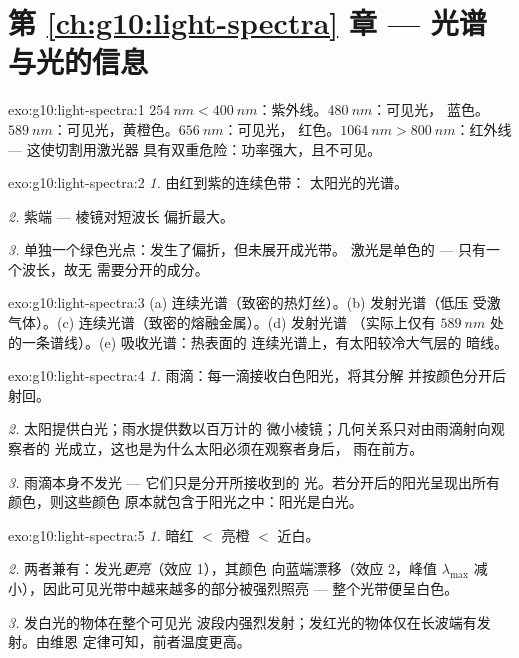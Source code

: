\section*{第 \ref{ch:g10:light-spectra} 章 --- 光谱与光的信息}

\begin{solution}{exo:g10:light-spectra:1}
$\qty{254}{nm} < \qty{400}{nm}$：紫外线。$\qty{480}{nm}$：可见光，
蓝色。$\qty{589}{nm}$：可见光，黄橙色。$\qty{656}{nm}$：可见光，
红色。$\qty{1064}{nm} > \qty{800}{nm}$：红外线 --- 这使切割用激光器
具有双重危险：功率强大，且不可见。
\end{solution}

\begin{solution}{exo:g10:light-spectra:2}
\emph{1.} 由红到紫的连续色带：
太阳光的光谱。

\emph{2.} 紫端 --- 棱镜对短波长
偏折最大。

\emph{3.} 单独一个绿色光点：发生了偏折，但未展开成光带。
激光是单色的 --- 只有一个波长，故无
需要分开的成分。
\end{solution}

\begin{solution}{exo:g10:light-spectra:3}
(a) 连续光谱（致密的热灯丝）。(b) 发射光谱（低压
受激气体）。(c) 连续光谱（致密的熔融金属）。(d) 发射光谱
（实际上仅有 $\qty{589}{nm}$ 处的一条谱线）。(e) 吸收光谱：热表面的
连续光谱上，有太阳较冷大气层的
暗线。
\end{solution}

\begin{solution}{exo:g10:light-spectra:4}
\emph{1.} 雨滴：每一滴接收白色阳光，将其分解
并按颜色分开后射回。

\emph{2.} 太阳提供白光；雨水提供数以百万计的
微小棱镜；几何关系只对由雨滴射向观察者的
光成立，这也是为什么太阳必须在观察者身后，
雨在前方。

\emph{3.} 雨滴本身不发光 --- 它们只是分开所接收到的
光。若分开后的阳光呈现出所有颜色，则这些颜色
原本就包含于阳光之中：阳光是白光。
\end{solution}

\begin{solution}{exo:g10:light-spectra:5}
\emph{1.} 暗红 $<$ 亮橙 $<$ 近白。

\emph{2.} 两者兼有：发光\emph{更亮}（效应 1），其颜色
向蓝端漂移（效应 2，峰值 $\lambda_{\max}$
减小），因此可见光带中越来越多的部分被强烈照亮 ---
整个光带便呈白色。

\emph{3.} 发白光的物体在整个可见光
波段内强烈发射；发红光的物体仅在长波端有发射。由维恩
定律可知，前者温度更高。
\end{solution}

